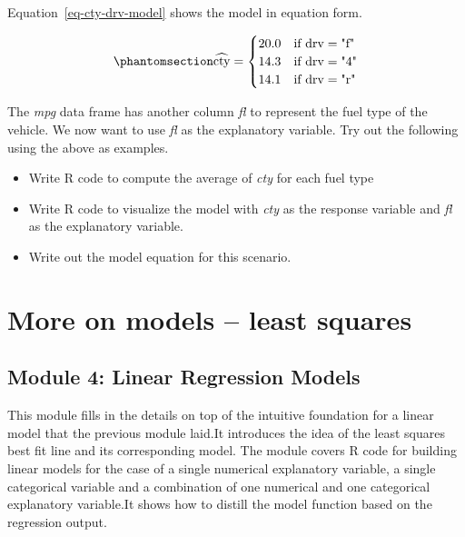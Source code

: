 \documentclass[
  12pt,
  letterpaper,
  DIV=11,
  numbers=noendperiod]{scrreprt}
\providecommand{\tightlist}{%
  \setlength{\itemsep}{0pt}\setlength{\parskip}{0pt}}
\begin{document}
Equation~\ref{eq-cty-drv-model} shows the model in equation form.

\begin{equation}\phantomsection\label{eq-cty-drv-model}{
\widehat{\text{cty}} =
\begin{cases}
20.0 & \text{if } \text{drv} = \text{"f"} \\
14.3 & \text{if } \text{drv} = \text{"4"} \\
14.1 & \text{if } \text{drv} = \text{"r"} \\
\end{cases}
}\end{equation}

The \emph{mpg} data frame has another column \emph{fl} to represent the
fuel type of the vehicle. We now want to use \emph{fl} as the
explanatory variable. Try out the following using the above as examples.

\begin{itemize}
\tightlist
\item
  Write R code to compute the average of \emph{cty} for each fuel type
\item
  Write R code to visualize the model with \emph{cty} as the response
  variable and \emph{fl} as the explanatory variable.
\item
  Write out the model equation for this scenario.
\end{itemize}

\part{More on models -- least squares}

\chapter*{Module 4: Linear Regression
Models}\label{module-4-linear-regression-models}


This module fills in the details on top of the intuitive foundation for
a linear model that the previous module laid.It introduces the idea of
the least squares best fit line and its corresponding model. The module
covers R code for building linear models for the case of a single
numerical explanatory variable, a single categorical variable and a
combination of one numerical and one categorical explanatory variable.It
shows how to distill the model function based on the regression output.
\end{document}
